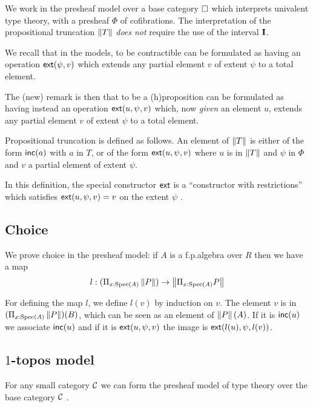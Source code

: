     We work in the presheaf model over a base category $\square$ which interprets univalent type theory,
    with a presheaf $\Phi$ of cofibrations. The interpretation of the propositional
    truncation $\left\lVert T \right\rVert$ {\em does not} require the use of the interval $\mathbf{I}$.

    We recall that in the models, to be contractible can be formulated as having an operation
    $\mathsf{ext}(\psi,v)$ which extends any partial element $v$ of extent $\psi$ to a total element.

    The (new) remark is then that to be a (h)proposition can be formulated as having instead
    an operation $\mathsf{ext}(u,\psi,v)$ which, now {\em given}
    an element $u$, extends any partial element $v$ of extent $\psi$ to a total element.

\medskip    

Propositional truncation is defined as follows. An element of $\left\lVert T \right\rVert$ is either of the form
$\mathsf{inc}(a)$ with $a$ in $T$, or of the form $\mathsf{ext}(u,\psi,v)$ where $u$ is in $\left\lVert T \right\rVert$ and $\psi$
in $\Phi$ and $v$ a partial element of extent $\psi$.

In this definition, the special constructor $\mathsf{ext}$ is a ``constructor with restrictions'' which
satisfies $\mathsf{ext}(u,\psi,v) = v$ on the extent $\psi$ \cite{CoquandHM18}.

\subsection{Choice}

We prove choice in the presheaf model: if $A$ is a f.p.\@ algebra over $R$ then we have a map
$$
l:(\Pi_{x:\operatorname{Spec}(A)}\left\lVert P \right\rVert)\rightarrow \left\lVert \Pi_{x:\operatorname{Spec}(A)}P \right\rVert
$$

For defining the map $l$, we define $l(v)$ by induction on $v$.
The element $v$ is in $(\Pi_{x:\operatorname{Spec}(A)}\left\lVert P \right\rVert)(B)$, which can be seen as
an element of $\left\lVert P \right\rVert(A)$. If it is $\mathsf{inc}(u)$ we associate $\mathsf{inc}(u)$ and 
if it is $\mathsf{ext}(u,\psi,v)$ the image is $\mathsf{ext}(l(u),\psi,l(v))$.

\subsection{$1$-topos model}

For any small category $\mathcal{C}$ we can form the presheaf model of type theory over the base category $\mathcal{C}$ \cite{hofmann,huber-phd-thesis}.

\medskip

